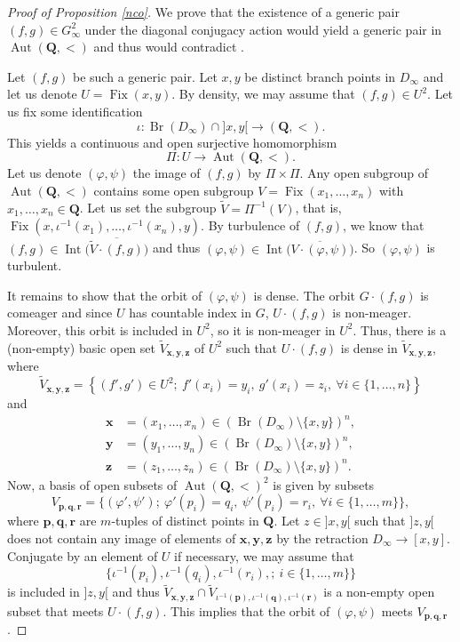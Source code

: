 \documentclass[JEP,XML,SOM,Unicode,NoFloatCountersInSection]{cedram}
\theoremstyle{plain}
\theoremstyle{definition}
\newcommand{\QQ}{\mathbf{Q}}
\DeclareMathOperator{\Aut}{Aut}
\DeclareMathOperator{\Int}{Int}
\DeclareMathOperator{\Br}{Br}
\DeclareMathOperator{\Fix}{Fix}
\begin{document}
\begin{proof}[Proof of Proposition \ref{nco}] We prove that the existence of a generic pair $(f,g)\in G_{\infty}^2$ under the diagonal conjugacy action would yield a generic pair in $\Aut(\QQ,<)$ and thus would contradict \cite[Th.\,2.4]{MR2354899}.

Let $(f,g)$ be such a generic pair. Let $x,y$ be distinct branch points in $D_\infty$ and let us denote $U=\Fix(x,y)$. By density, we may assume that $(f,g)\in U^2$. Let us fix some identification
\[
\iota\colon\Br(D_\infty)\cap{}]x,y[{}\to(\QQ,<).
\]
This yields a continuous and open surjective homomorphism
\[
\Pi\colon U\to\Aut(\QQ,<).
\]
Let us denote $(\varphi,\psi)$ the image of $(f,g)$ by $\Pi\times\Pi$. Any open subgroup of $\Aut(\QQ,<)$ contains some open subgroup $V=\Fix(x_1,\dots,x_n)$ with $x_1,\dots,x_n\in\QQ$. Let us set the subgroup $\widetilde{V}=\Pi^{-1}(V)$, that is, $\Fix(x,\iota^{-1}(x_1),\dots,\iota^{-1}(x_n),y)$. By turbulence of $(f,g)$, we know that $(f,g)\in\Int\bigl(\overline{\widetilde{V}\cdot (f,g)}\bigr)$ and thus $(\varphi,\psi)\in\Int\bigl(\overline{{V}\cdot(\varphi,\psi)}\bigr)$. So $(\varphi,\psi)$ is turbulent.

It remains to show that the orbit of $(\varphi,\psi)$ is dense. The orbit $G\cdot(f,g)$ is comeager and since $U$ has countable index in $G$, $U\cdot(f,g)$ is non-meager. Moreover, this orbit is included in $U^2$, so it is non-meager in $U^2$. Thus, there is a (non-empty) basic open set $\widetilde{V}_{\boldsymbol{x,y,z}}$ of $U^2$ such that $U\cdot(f,g)$ is dense in $\widetilde{V}_{\boldsymbol{x,y,z}}$, where
\[
\widetilde{V}_{\boldsymbol{x,y,z}}=\left\{(f',g')\in U^2; \ f'(x_i)=y_i,\ g'(x_i)=z_i,\ \forall i\in\{1,\dots,n\}\right\}
\]
and
\begin{align*}
\boldsymbol{x}&=(x_1,\dots,x_n)\in \left(\Br(D_\infty)\setminus\{x,y\}\right)^n,\\
\boldsymbol{y}&=(y_1,\dots,y_n)\in \left(\Br(D_\infty)\setminus\{x,y\}\right)^n,\\
\boldsymbol{z}&=(z_1,\dots,z_n)\in \left(\Br(D_\infty)\setminus\{x,y\}\right)^n.
\end{align*}
Now, a basis of open subsets of $\Aut(\QQ,<)^2$ is given by subsets
\[
V_{\boldsymbol{p,q,r}}=\bigl\{(\varphi',\psi');\ \varphi'(p_i)=q_i,\ \psi'(p_i)=r_i,\ \forall i\in\{1,\dots,m\}\bigr\},
\]
where $\boldsymbol{p,q,r}$ are $m$-tuples of distinct points in $\QQ$. Let $z\in{}]x,y[$ such that $]z,y[$ does not contain any image of elements of $\boldsymbol{x,y,z}$ by the retraction $D_\infty\to[x,y]$. Conjugate by an element of $U$ if necessary, we may assume that
\[
\{\iota^{-1}(p_i),\iota^{-1}(q_i),\iota^{-1}(r_i),; \ i\in\{1,\dots,m\}\}
\]
is included in $]z,y[$ and thus $\widetilde{V}_{\boldsymbol{x,y,z}}\cap\widetilde{V}_{\iota^{-1}(\boldsymbol{p}),\iota^{-1}(\boldsymbol{q}),\iota^{-1}(\boldsymbol{r})}$ is a non-empty open subset that meets $U\cdot(f,g)$. This implies that the orbit of $(\varphi,\psi)$ meets $V_{\boldsymbol{p,q,r}}$.
\end{proof}
\end{document}
